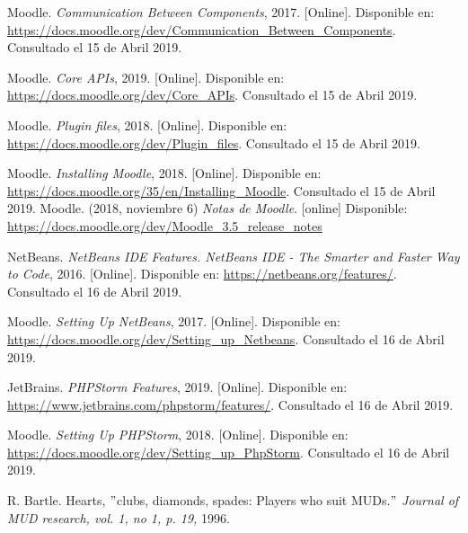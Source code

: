 \begin{thebibliography}{9}
        Moodle. {\it Communication Between Components}, 2017. [Online]. Disponible en: \url{https://docs.moodle.org/dev/Communication_Between_Components}. Consultado el 15 de Abril 2019.
    
        Moodle. {\it Core APIs}, 2019. [Online]. Disponible en: \url{https://docs.moodle.org/dev/Core_APIs}. Consultado el 15 de Abril 2019.
    
        Moodle. {\it Plugin files}, 2018. [Online]. Disponible en: \url{https://docs.moodle.org/dev/Plugin_files}. Consultado el 15 de Abril 2019.

        Moodle. {\it Installing Moodle}, 2018. [Online]. Disponible en: \url{https://docs.moodle.org/35/en/Installing_Moodle}. Consultado el 15 de Abril 2019.
    Moodle. (2018, noviembre 6) \textit{Notas de Moodle}. [online] Disponible:
    \url{https://docs.moodle.org/dev/Moodle_3.5_release_notes}
    
    
        NetBeans. {\it NetBeans IDE Features. NetBeans IDE - The Smarter and Faster Way to Code}, 2016. [Online]. Disponible en: \url{https://netbeans.org/features/}. Consultado el 16 de Abril 2019.
    
        Moodle. {\it Setting Up NetBeans}, 2017. [Online]. Disponible en: \url{https://docs.moodle.org/dev/Setting_up_Netbeans}. Consultado el 16 de Abril 2019.
    
        JetBrains. {\it PHPStorm Features}, 2019. [Online]. Disponible en: \url{https://www.jetbrains.com/phpstorm/features/}. Consultado el 16 de Abril 2019.
    
        Moodle. {\it Setting Up PHPStorm}, 2018. [Online]. Disponible en: \url{https://docs.moodle.org/dev/Setting_up_PhpStorm}. Consultado el 16 de Abril 2019.
    
    

        R. Bartle. Hearts, 
        $"$clubs, diamonds, spades: Players who suit MUDs.$"$
        \textit{Journal of MUD research, vol. 1, no 1, p. 19,} 1996.    
    

\end{thebibliography}
